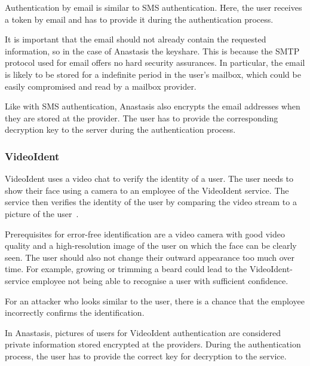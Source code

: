 Authentication by email is similar to SMS authentication. Here,
the user receives a token by email and has to provide it during the
authentication process.

It is important that the email should not already contain the
requested information, so in the case of Anastasis the keyshare.  This
is because the SMTP protocol used for email offers no hard security
assurances. In particular, the email is likely to be stored for a
indefinite period in the user's mailbox, which could be easily
compromised and read by a mailbox provider.~\cite{emailauthowasp}

Like with SMS authentication, Anastasis also encrypts the email
addresses when they are stored at the provider.  The user has to
provide the corresponding decryption key to the server during
the authentication process.


\subsubsection{VideoIdent}

VideoIdent uses a video chat to verify the identity of a user. The
user needs to show their face using a camera to an employee of the
VideoIdent service. The service then verifies the identity of the user
by comparing the video stream to a picture of the
user~\cite{pohlmann2017}.

Prerequisites for error-free identification are a video camera with
good video quality and a high-resolution image of the user on which
the face can be clearly seen. The user should also not change their
outward appearance too much over time. For example, growing or
trimming a beard could lead to the VideoIdent-service employee not
being able to recognise a user with sufficient confidence.

For an attacker who looks similar to the user, there is a chance that
the employee incorrectly confirms the identification.


In Anastasis, pictures of users for VideoIdent authentication are
considered private information stored encrypted at the providers.
During the authentication process, the user has to provide the correct
key for decryption to the service.

